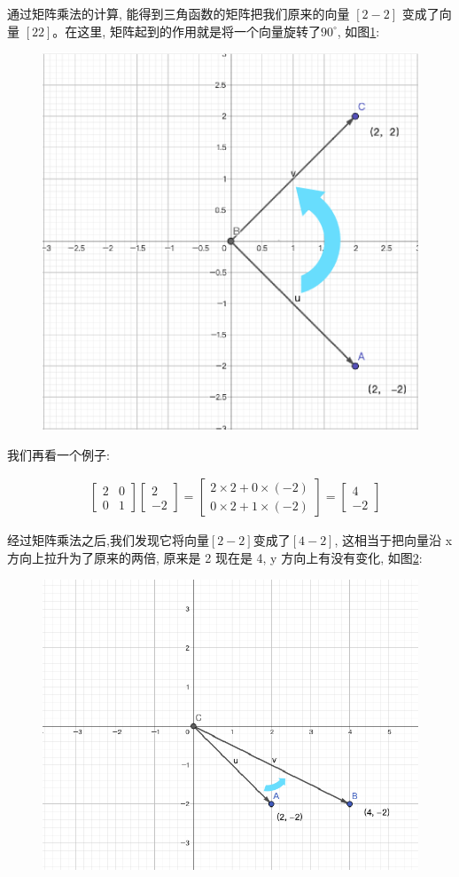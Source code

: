 通过矩阵乘法的计算, 能得到三角函数的矩阵把我们原来的向量 $[2 -2]$ 变成了向量 $[2 2]$。在这里, 矩阵起到的作用就是将一个向量旋转了$90^{\circ}$, 如图\ref{fig:img19_1}: 

\begin{figure}[ht]
  \centering
  \includegraphics[width=0.5\linewidth]{asset/20230913133039.png}
  \caption{}
  \label{fig:img19_1}
\end{figure}


我们再看一个例子: 

\begin{align*}
& \begin{bmatrix}
2 & 0 \\
0 & 1
\end{bmatrix}
\begin{bmatrix}
2 \\ -2
\end{bmatrix} = \begin{bmatrix}
2 \times 2 + 0 \times (-2) \\
0 \times 2 + 1 \times (-2)
\end{bmatrix} = \begin{bmatrix} 4 \\ -2 \end{bmatrix}
\end{align*}

经过矩阵乘法之后,我们发现它将向量$[2 -2]$变成了$[4 -2]$, 这相当于把向量沿 x 方向上拉升为了原来的两倍, 原来是 2 现在是 4, y 方向上有没有变化, 如图\ref{fig:img19_2}: 

\begin{figure}[ht]
  \centering
  \includegraphics[width=0.5\linewidth]{asset/20230913135453.png}
  \caption{}
  \label{fig:img19_2}
\end{figure}

